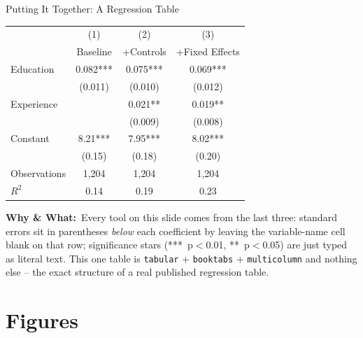 \documentclass[11pt,aspectratio=169]{beamer}
\newcommand{\whybox}[1]{%
  \vspace{2pt}
  {\scriptsize\raggedright\textcolor{red!55!black}{\textbf{Why \& What:}}~#1\par}
}
\begin{document}
\begin{frame}{Putting It Together: A Regression Table}
  \footnotesize
  \begin{center}
  \begin{tabular}{lccc}
    \toprule
     & (1) & (2) & (3) \\
     & Baseline & +Controls & +Fixed Effects \\
    \midrule
    Education & 0.082*** & 0.075*** & 0.069*** \\
     & (0.011) & (0.010) & (0.012) \\
    Experience & & 0.021** & 0.019** \\
     & & (0.009) & (0.008) \\
    Constant & 8.21*** & 7.95*** & 8.02*** \\
     & (0.15) & (0.18) & (0.20) \\
    \midrule
    Observations & 1{,}204 & 1{,}204 & 1{,}204 \\
    $R^2$ & 0.14 & 0.19 & 0.23 \\
    \bottomrule
  \end{tabular}
  \end{center}
  \vspace{4pt}
  \whybox{Every tool on this slide comes from the last three: standard
  errors sit in parentheses \emph{below} each coefficient by leaving
  the variable-name cell blank on that row; significance stars
  (***~p$<$0.01, **~p$<$0.05) are just typed as literal text. This one
  table is \texttt{tabular} + \texttt{booktabs} + \texttt{multicolumn}
  and nothing else -- the exact structure of a real published
  regression table.}
\end{frame}

\section{Figures}
\end{document}
